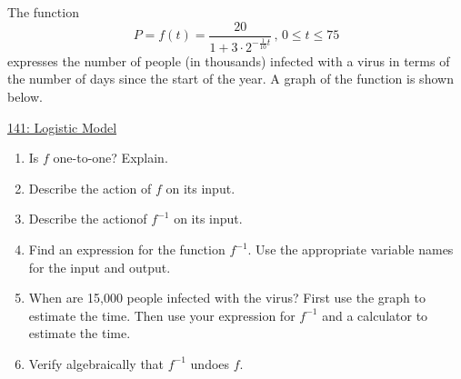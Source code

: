 \documentclass{ximera}
\begin{document}
\begin{question} \label{Qdfl3r3r}
The function
\[
     P =f(t) = \frac{20}{1+3 \cdot 2^{-\frac{1}{10}t}} \, , \, 0\leq t \leq 75
\]
expresses the number of people (in thousands) infected with a virus in terms of the number of days since the start of the year. A graph of the function is shown below.

\begin{onlineOnly}
    \begin{center}
\end{center}
\end{onlineOnly}

\href{https://www.desmos.com/calculator/1haivflyxu}{141: Logistic Model}

\begin{enumerate}
\item Is $f$ one-to-one? Explain.

\item Describe the action of $f$ on its input.

\item Describe the actionof $f^{-1}$ on its input.

\item Find an expression for the function $f^{-1}$. Use the appropriate variable names for the input and output.

\item When are 15,000 people infected with the virus? First use the graph to estimate the time. Then use your expression for $f^{-1}$ and a calculator to estimate the time.

\item Verify algebraically that $f^{-1}$ undoes $f$.
\end{enumerate}
\end{question}
\end{document}
